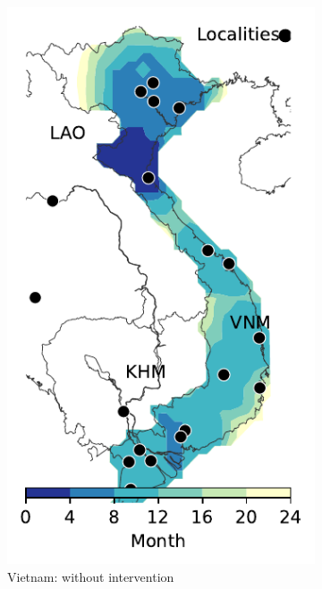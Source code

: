 \documentclass[11pt]{article}
\theoremstyle{definition}
\begin{document}
\begin{figure}[ht]
\begin{subfigure}[b]{.28\textwidth}
\includegraphics[width=\textwidth]{../cellular_automata/results/contour/VN_model-B_precip1_m1_l3.pdf}
\caption{Vietnam: without intervention\label{fig:vnmBContour}}
\end{subfigure}
\begin{subfigure}[b]{.28\textwidth}

\end{subfigure}
\end{figure}
\end{document}
